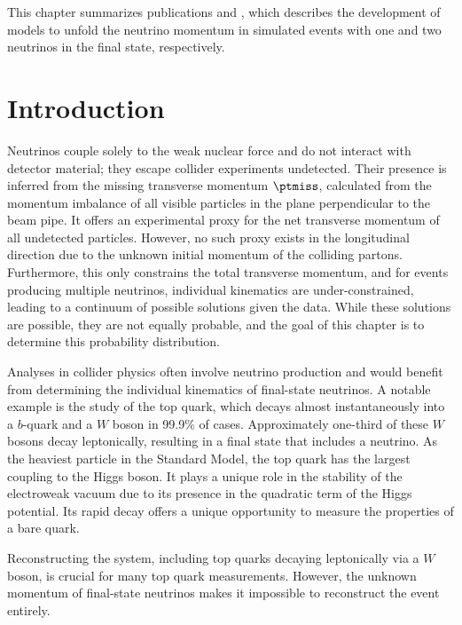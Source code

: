 This chapter summarizes publications \textcite{NuFlows1} and \textcite{Nu2Flows}, which describes the development of models to unfold the neutrino momentum in simulated \ttbar events with one and two neutrinos in the final state, respectively.

\section{Introduction}

Neutrinos couple solely to the weak nuclear force and do not interact with detector material; they escape collider experiments undetected.
Their presence is inferred from the missing transverse momentum $\ptmiss$, calculated from the momentum imbalance of all visible particles in the plane perpendicular to the beam pipe.
It offers an experimental proxy for the net transverse momentum of all undetected particles.
However, no such proxy exists in the longitudinal direction due to the unknown initial momentum of the colliding partons.
Furthermore, this only constrains the total transverse momentum, and for events producing multiple neutrinos, individual kinematics are under-constrained, leading to a continuum of possible solutions given the data.
While these solutions are possible, they are not equally probable, and the goal of this chapter is to determine this probability distribution.

Analyses in collider physics often involve neutrino production and would benefit from determining the individual kinematics of final-state neutrinos.
A notable example is the study of the top quark, which decays almost instantaneously into a $b$-quark and a $W$ boson in 99.9\% of cases.
Approximately one-third of these $W$ bosons decay leptonically, resulting in a final state that includes a neutrino.
As the heaviest particle in the Standard Model, the top quark has the largest coupling to the Higgs boson.
It plays a unique role in the stability of the electroweak vacuum due to its presence in the quadratic term of the Higgs potential.
Its rapid decay offers a unique opportunity to measure the properties of a bare quark.

Reconstructing the \ttbar system, including top quarks decaying leptonically via a $W$ boson, is crucial for many top quark measurements.
However, the unknown momentum of final-state neutrinos makes it impossible to reconstruct the event entirely.

